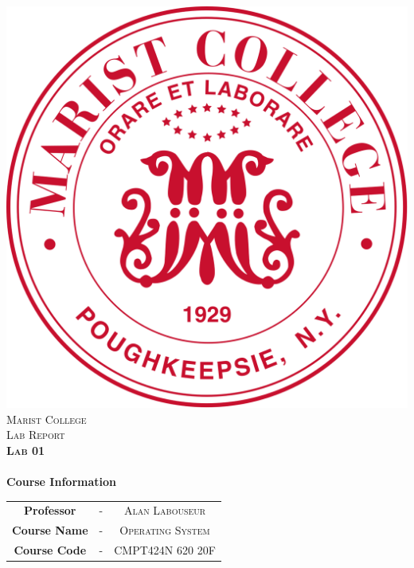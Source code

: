 \includegraphics[scale=0.15]{edit/logo.png}\\[1cm] %

\textsc{\LARGE Marist College}\\[1.5cm] %
\textsc{\Large Lab Report}\\[0.5cm]
\textsc{\Large \textbf{Lab 01}}\\[0.5cm]

\HRule \\[0.6cm]
{\Large\bfseries Course Information}\\[0.4cm] %
\begin{tabular}{c c c}
\large{\bfseries Professor} & - & \large{\textsc{Alan Labouseur}}\\ %
\large{\bfseries Course Name} & - & \large{\textsc{Operating System}}\\ %
\large{\bfseries Course Code} & - & \large{\textsc{CMPT424N 620 20F}}\\[7mm] %
\end{tabular}
\HRule \\[1.5cm]
